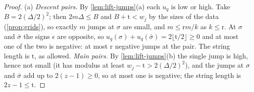 \begin{proof}
(a) \emph{Descent pairs.} By \cref{lem:lift-jumps}(a) each $u_q$ is low or high. Take $B=2(\Delta/2)^2$; then $2m\Delta\le B$ and $B+\mathrm t<w_j$ by the sizes of the data (\cref{prop:grids}), so exactly $m$ jumps at $\sigma$ are small, and
$m\le\mathrm rm/k$ as $k\le\mathrm r$. At $\sigma$ and $\bar\sigma$ the signs $\epsilon$ are opposite, so $u_q(\sigma)+u_q(\bar\sigma)=2\lfloor\mathrm t/2\rfloor\ge0$ and at most one of the two is negative: at most $\mathrm r$ negative jumps at the pair. The string length is
$\mathrm t$, as allowed. \emph{Main pairs.} By \cref{lem:lift-jumps}(b) the single jump is high, hence not small (it has modulus at least $w_j-\mathrm t>2(\Delta/2)^2$), and the jumps at $\sigma$ and $\bar\sigma$ add up to $2(z-1)\ge0$, so at most one is
negative; the string length is $2z-1\le\mathrm t$.


\end{proof}
